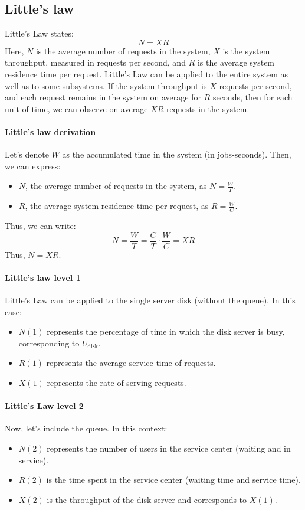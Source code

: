 \subsection{Little's law}
Little's Law states:
\[N = XR\]
Here, $N$ is the average number of requests in the system, $X$ is the system throughput, measured in requests per second, and $R$ is the average system residence time per request.
Little's Law can be applied to the entire system as well as to some subsystems.
If the system throughput is $X$ requests per second, and each request remains in the system on average for $R$ seconds, then for each unit of time, we can observe on average $XR$ requests in the system.

\paragraph*{Little's law derivation}
Let's denote $W$ as the accumulated time in the system (in jobs-seconds).
Then, we can express:
\begin{itemize}
    \item $N$, the average number of requests in the system, as $N=\frac{W}{T}$.
    \item $R$, the average system residence time per request, as $R=\frac{W}{C}$.
\end{itemize}
Thus, we can write:
\[N=\dfrac{W}{T}=\dfrac{C}{T}\cdot\dfrac{W}{C}=XR\]
Thus, $N = XR$. 

\paragraph*{Little's law level 1}
Little's Law can be applied to the single server disk (without the queue).
In this case:
\begin{itemize}
    \item $N(1)$ represents the percentage of time in which the disk server is busy, corresponding to $U_{\text{disk}}$. 
    \item $R(1)$ represents the average service time of requests.
    \item $X(1)$ represents the rate of serving requests.
\end{itemize}

\paragraph*{Little's Law level 2}
Now, let's include the queue.
In this context:
\begin{itemize}
    \item $N(2)$ represents the number of users in the service center (waiting and in service).
    \item $R(2)$ is the time spent in the service center (waiting time and service time).
    \item $X(2)$ is the throughput of the disk server and corresponds to $X(1)$.
\end{itemize}

